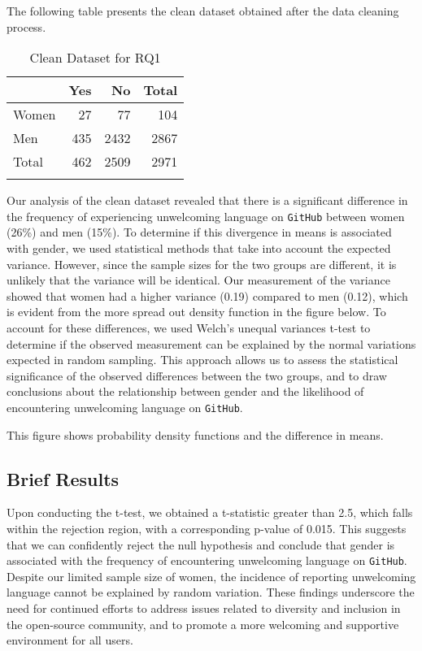 \documentclass[journal,12pt,onecolumn,]{IEEEtran}
\begin{document}
The following table presents the clean dataset obtained after the data cleaning process.
\begin{table}[h]
    \centering
\caption{Clean Dataset for RQ1}
\begin{tabular}{lrrr}
    \toprule
          & Yes & No   & Total \\
    \midrule
    Women & 27  & 77   & 104   \\
    Men   & 435 & 2432 & 2867  \\
    Total & 462 & 2509 & 2971  \\
    \bottomrule                \\
\end{tabular}

\end{table}
Our analysis of the clean dataset revealed that there is a significant difference in the frequency of experiencing unwelcoming language on \texttt{GitHub} between women (26\%) and men (15\%). 
To determine if this divergence in means is associated with gender, we used statistical methods that take into account the expected variance. 
However, since the sample sizes for the two groups are different, it is unlikely that the variance will be identical. Our measurement of the variance showed that women had a higher variance (0.19) compared to men (0.12), 
which is evident from the more spread out density function in the figure below. 
To account for these differences, we used Welch's unequal variances t-test to determine if the observed measurement can be explained by the normal variations expected in random sampling. 
This approach allows us to assess the statistical significance of the observed differences between the two groups, and to draw conclusions about the relationship between gender and the likelihood of encountering unwelcoming language on \texttt{GitHub}.

\begin{figure}[h]
    \centering
    
\end{figure}

This figure shows probability density functions and the difference in means.
\subsection{Brief Results}
Upon conducting the t-test, we obtained a t-statistic greater than 2.5, which falls within the rejection region, 
with a corresponding p-value of 0.015.
This suggests that we can confidently reject the null hypothesis and conclude that gender is associated with the frequency of encountering unwelcoming language on \texttt{GitHub}. 
Despite our limited sample size of women, the incidence of reporting unwelcoming language cannot be explained by random variation. 
These findings underscore the need for continued efforts to address issues related to diversity and inclusion in the open-source community, and to promote a more welcoming and supportive environment for all users.
\end{document}
